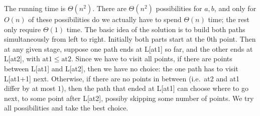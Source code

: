 \documentclass[11pt]{article}
\begin{document}
The running time is $\Theta(n^2)$.  
There are $\Theta(n^2)$ possibilities for $a,b$, and only for $O(n)$ of these possibilities do we actually have to spend $\Theta(n)$ time; the rest only require $\Theta(1)$ time.
The basic idea of the solution is
to build both paths simultaneously from left to right.  Initially both
parts start at the $0$th point.  Then at any given stage, suppose one
path ends at L[at1] so far, and the other ends at L[at2], with
$\mathrm{at1}\le\mathrm{at2}$.  Since we have to visit all points, if
there are points between L[at1] and L[at2], then we have no choice:
the one path has to visit L[at1+1] next.  Otherwise, if there are no
points in between (i.e.\ at2 and at1 differ by at most $1$), then the
path that ended at L[at1] can choose where to go next, to some point
after L[at2], possiby skipping some number of points.  We try all
possibilities and take the best choice.
\end{document}
